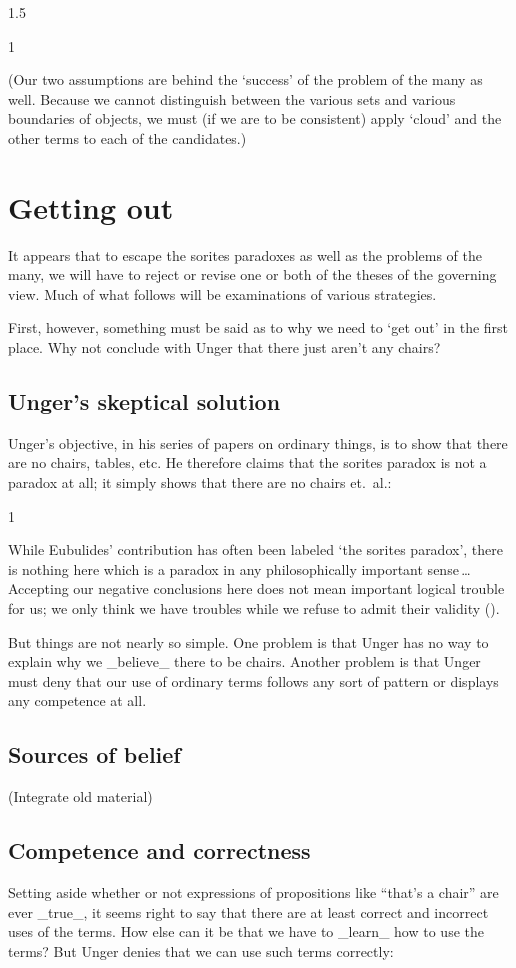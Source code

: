 \documentclass[11pt]{article}
\newenvironment{squote}{%
\begin{spacing}{1}
       	\begin{list}{}{%
\setlength{\labelwidth}{0pt}%
\rightmargin\leftmargin%
}
\item\relax
}{%
\end{list}%
\end{spacing}
}
\begin{document}
\begin{spacing}{1.5}
\begin{squote}
(Our two assumptions are behind the `success' of the problem of the
many as well.  Because we cannot distinguish between the various sets
and various boundaries of objects, we must (if we are to be
consistent) apply `cloud' and the other terms to each of the
candidates.)

\section{Getting out}
It appears that to escape the sorites paradoxes as well as the
problems of the many, we will have to reject or revise one or both of
the theses of the governing view.  Much of what follows will be
examinations of various strategies.

First, however, something must be said as to why we need to `get out'
in the first place.  Why not conclude with Unger that there just
aren't any chairs?

\subsection{Unger's skeptical solution}
Unger's objective, in his series of papers on ordinary things, is to
show that there are no chairs, tables, etc.  He therefore claims that
the sorites paradox is not a paradox at all; it simply shows that
there are no chairs et.\ al.:

\begin{squote}
While Eubulides' contribution has often been labeled `the sorites
paradox', there is nothing here which is a paradox in any
philosophically important sense\,\ldots\,Accepting our negative
conclusions here does not mean important logical trouble for us; we
only think we have troubles while we refuse to admit their validity
(\citeyear[145]{unger1979}).
\end{squote}

But things are not nearly so simple.  One problem is that Unger has no
way to explain why we _believe_ there to be chairs.  Another problem
is that Unger must deny that our use of ordinary terms follows any
sort of pattern or displays any competence at all.

\subsection{Sources of belief}
(Integrate old material)

\subsection{Competence and correctness}
Setting aside whether or not expressions of propositions like ``that's
a chair'' are ever _true_, it seems right to say that there are at
least correct and incorrect uses of the terms.  How else can it be
that we have to _learn_ how to use the terms?  But Unger denies that
we can use such terms correctly:


\end{squote}
\end{spacing}
\end{document}
